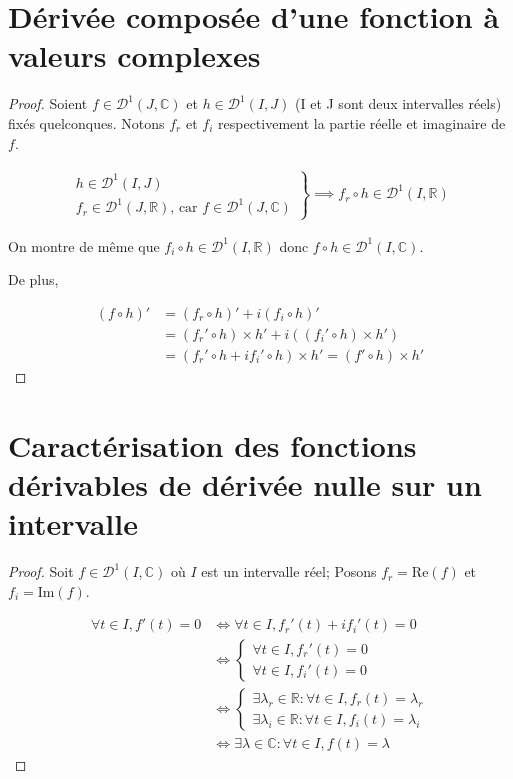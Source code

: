 \documentclass[french]{article}
\renewcommand{\Re}{\text{Re}}
\renewcommand{\Im}{\text{Im}}
\newcommand{\C}{\mathbb C}
\newcommand{\R}{\mathbb R}
\begin{document}
\section{Dérivée composée d'une fonction à valeurs complexes}
\begin{proof}
Soient $f \in \mathcal D ^1(J, \C) $ et $h \in \mathcal D^1(I, J)$ (I et J sont deux intervalles réels) fixés quelconques. Notons $f_r$ et $f_i$ respectivement la partie réelle et imaginaire de $f$.

\begin{align*}
	\left .
	\begin{array}{ll}
		h \in \mathcal D^1(I, J) \\
		f_r \in \mathcal D^1(J, \R) \text{, car } f \in \mathcal D^1(J, \C)
	\end{array}
	\right \}
	\implies f_r \circ h \in \mathcal D^1(I, \R)
\end{align*}

On montre de même que $f_i \circ h \in \mathcal D^1(I, \mathbb  R)$ donc $f \circ h \in \mathcal D^1(I, \C)$.

De plus,

\begin{align*}
	(f \circ h)' &= (f_r \circ h)' + i (f_i \circ h)' \\
	&= (f_r' \circ h ) \times h' + i((f_i' \circ h) \times h')\\
	&=(f_r' \circ h + if_i' \circ h) \times h' = (f' \circ h) \times h'
\end{align*}
\end{proof}
\section{Caractérisation des fonctions dérivables de dérivée nulle sur un intervalle}
\begin{proof}
Soit $f \in \mathcal D ^1 (I, \C)$ où $I$ est un intervalle réel;
Posons $f_r = \Re (f)$ et $f_i = \Im(f)$.

\begin{align*}
\forall t \in I, f'(t) = 0 &\iff \forall t \in I, f_r'(t) + i f_i'(t) = 0 \\
&\iff \begin{cases}
	\forall t \in I, f_r'(t) = 0 \\
	\forall t \in I, f_i'(t) = 0
\end{cases} \\
&\iff \begin{cases}
	\exists \lambda_r \in \R : \forall t \in I,  f_r(t) = \lambda_r \\
		\exists \lambda_i \in \R : \forall t \in I,  f_i(t) = \lambda_i
\end{cases} \\
&\iff \exists \lambda \in \C : \forall t \in I,  f(t) = \lambda
\end{align*}
\end{proof}
\end{document}
